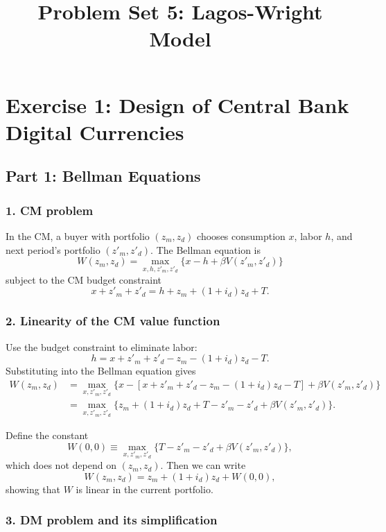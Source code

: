 \documentclass[11pt, a4paper]{article}
\title{\textbf{Problem Set 5: Lagos-Wright Model}}
\author{}
\date{}
\begin{document}
\maketitle

\section*{Exercise 1: Design of Central Bank Digital Currencies}

\subsection*{Part 1: Bellman Equations}

\subsubsection*{1. CM problem}

In the CM, a buyer with portfolio $(z_m,z_d)$ chooses consumption $x$, labor $h$, and next period's portfolio $(z'_m,z'_d)$.  
The Bellman equation is
\[
W(z_m,z_d)
= \max_{x,h,z'_m,z'_d} \{ x - h + \beta V(z'_m,z'_d) \}
\]
subject to the CM budget constraint
\[
x + z'_m + z'_d = h + z_m + (1+i_d) z_d + T.
\]

\subsubsection*{2. Linearity of the CM value function}

Use the budget constraint to eliminate labor:
\[
h = x + z'_m + z'_d - z_m - (1+i_d)z_d - T.
\]
Substituting into the Bellman equation gives
\begin{align*}
W(z_m,z_d)
&= \max_{x,z'_m,z'_d} \bigl\{
x - [x + z'_m + z'_d - z_m - (1+i_d)z_d - T]
+ \beta V(z'_m,z'_d) \bigr\} \\
&= \max_{x,z'_m,z'_d} \bigl\{
z_m + (1+i_d)z_d + T - z'_m - z'_d + \beta V(z'_m,z'_d)
\bigr\}.
\end{align*}

Define the constant
\[
W(0,0) \equiv \max_{x,z'_m,z'_d}
\{ T - z'_m - z'_d + \beta V(z'_m,z'_d) \},
\]
which does not depend on $(z_m,z_d)$.  
Then we can write
\[
W(z_m,z_d) = z_m + (1+i_d)z_d + W(0,0),
\]
showing that $W$ is linear in the current portfolio.

\subsubsection*{3. DM problem and its simplification}
\end{document}
